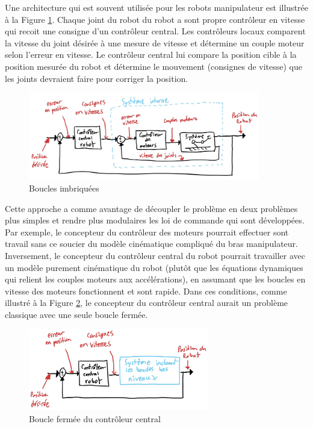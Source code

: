 Une architecture qui est souvent utilisée pour les robots manipulateur est illustrée à la Figure \ref{fig:innerloop}. Chaque joint du robot du robot a sont propre contrôleur en vitesse qui recoit une consigne d'un contrôleur central. Les contrôleurs locaux comparent la vitesse du joint désirée à une mesure de vitesse et détermine un couple moteur selon l'erreur en vitesse. Le contrôleur central lui compare la position cible à la position mesurée du robot et détermine le mouvement (consignes de vitesse) que les joints devraient faire pour corriger la position.
\begin{figure}[htbp]
	\centering
		\includegraphics[width=0.9\textwidth]{fig/innerloop.jpg}
	\caption{Boucles imbriquées}
	\label{fig:innerloop}
\end{figure}

Cette approche a comme avantage de découpler le problème en deux problèmes plus simples et rendre plus modulaires les loi de commande qui sont développées. Par exemple, le concepteur du contrôleur des moteurs pourrait effectuer sont travail sans ce soucier du modèle cinématique compliqué du bras manipulateur. Inversement, le concepteur du contrôleur central du robot pourrait travailler avec un modèle purement cinématique du robot (plutôt que les équations dynamiques qui relient les couples moteurs aux accélérations), en assumant que les boucles en vitesse des moteurs fonctionnent et sont rapide. Dans ces conditions, comme illustré à la Figure \ref{fig:innerloop2}, le concepteur du contrôleur central aurait un problème classique avec une seule boucle fermée.
\begin{figure}[htbp]
	\centering
		\includegraphics[width=0.7\textwidth]{fig/innerloop2.jpg}
	\caption{Boucle fermée du contrôleur central}
	\label{fig:innerloop2}
\end{figure}

